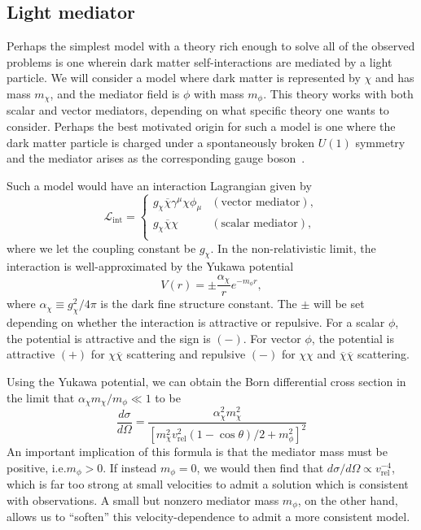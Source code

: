 \hypertarget{light-mediator}{%
\subsection{Light mediator}\label{light-mediator}}

Perhaps the simplest model with a theory rich enough to solve all of the
observed problems is one wherein dark matter self-interactions are
mediated by a light particle. We will consider a model where dark matter
is represented by \(\chi\) and has mass \(m_\chi\), and the mediator
field is \(\phi\) with mass \(m_\phi\). This theory works with both
scalar and vector mediators, depending on what specific theory one wants
to consider. Perhaps the best motivated origin for such a model is one
where the dark matter particle is charged under a spontaneously broken
\(U(1)\) symmetry and the mediator arises as the corresponding gauge
boson~\cite{tulin_dark_2018}.

Such a model would have an interaction Lagrangian given by
\begin{equation}
\mathcal{L}_{\text{int}} =
\left\{ 
\begin{array}{cl}
    g_\chi \overline{\chi} \gamma^\mu \chi \phi_\mu
    & (\text{vector mediator}), \\
    g_\chi \overline{\chi} \chi
    & (\text{scalar mediator}), \\
\end{array}
\right.
\end{equation}
where we let the coupling constant be \(g_\chi\). In the non-relativistic
limit, the interaction is well-approximated by the Yukawa potential~\cite{tulin_beyond_2013,tulin_resonant_2013}
\begin{equation}
V(r) = \pm \frac{\alpha_\chi}{r} e^{-m_\phi r},
\end{equation}
where \(\alpha_\chi \equiv g_\chi^2/4\pi\) is the dark fine structure
constant. The \(\pm\) will be set depending on whether the interaction is
attractive or repulsive. For a scalar \(\phi\), the potential is attractive
and the sign is \((-)\). For vector \(\phi\), the potential is attractive
\((+)\) for \(\chi\overline{\chi}\) scattering and repulsive \((-)\) for
\(\chi\chi\) and \(\overline{\chi}\overline{\chi}\) scattering.

Using the Yukawa potential, we can obtain the Born differential cross section
in the limit that \(\alpha_\chi m_\chi / m_\phi \ll 1\) to
be~\cite{tulin_dark_2018}
\begin{equation}
\frac{d\sigma}{d\Omega} = \frac{\alpha_\chi^2 m_\chi^2}{\left[
    m_\chi^2 v_{\text{rel}}^2 (1 - \cos\theta) / 2
    + m_\phi^2 \right]^2}
\end{equation}
An important implication of this formula is that the mediator mass must be
positive, i.e.\(m_\phi > 0\). If instead \(m_\phi = 0\), we would then find
that \( d\sigma/d\Omega \propto v_{\text{rel}}^{-4}\), which is far too strong
at small velocities to admit a solution which is consistent with observations.
A small but nonzero mediator mass \(m_\phi\), on the other hand, allows us to
``soften'' this velocity-dependence to admit a more consistent model.

